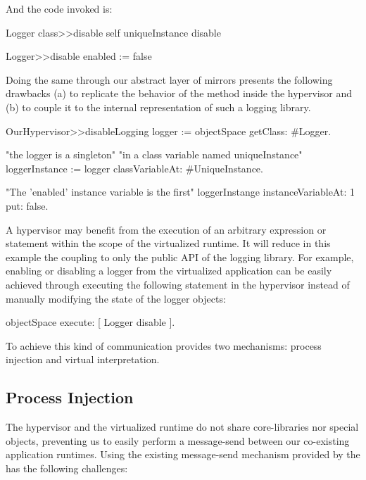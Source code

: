 And the code invoked is:

\begin{code}
Logger class>>disable
	self uniqueInstance disable
	
Logger>>disable
	enabled := false
\end{code}

Doing the same through our abstract layer of mirrors presents the following drawbacks (a) to replicate the behavior of the  method inside the hypervisor and (b) to couple it to the internal representation of such a logging library. 

\begin{code}
OurHypervisor>>disableLogging
	logger := objectSpace getClass: #Logger.

	"the logger is a singleton"
	"in a class variable named uniqueInstance"
	loggerInstance := logger classVariableAt: #UniqueInstance.

	"The 'enabled' instance variable is the first"
	loggerInstange instanceVariableAt: 1 put: false.
\end{code}

A hypervisor may benefit from the execution of an arbitrary expression or statement within the scope of the virtualized runtime. It will reduce in this example the coupling to only the public API of the logging library. For example, enabling or disabling a logger from the virtualized application can be easily achieved through executing the following statement in the hypervisor instead of manually modifying the state of the logger objects:

\begin{code}
objectSpace execute: [ Logger disable ].
\end{code}

To achieve this kind of communication \Vtt provides two mechanisms: process injection and virtual interpretation.

\subsection{Process Injection}
The hypervisor and the virtualized runtime do not share core-libraries nor special objects, preventing us to easily perform a message-send between our co-existing application runtimes. Using the existing message-send mechanism provided by the \VM has the following challenges:

